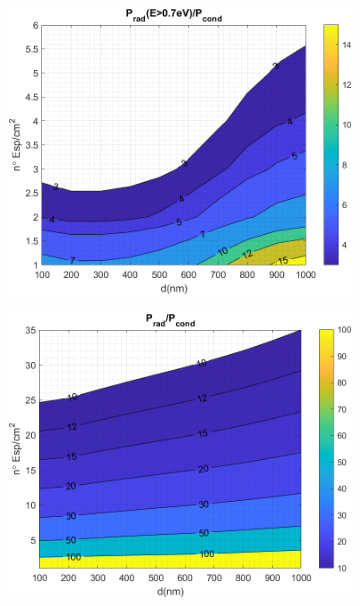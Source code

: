 \begin{figure}[H]
	\centering
	\begin{subfigure}[b]{0.49\textwidth}
		\centering
		\includegraphics[width=1.00\textwidth]{figuras/Resultados/RelacionCondRad/SiC_Ge.png}
		\caption{ }
		\label{fig:rel_SiCSiO2Ge}
	\end{subfigure}
	\hfill
	\begin{subfigure}[b]{0.49\textwidth}
		\centering
		\includegraphics[width=1.00\textwidth]{figuras/Resultados/RelacionCondRad/SiC_Ge_full.png}

\end{subfigure}
\end{figure}
